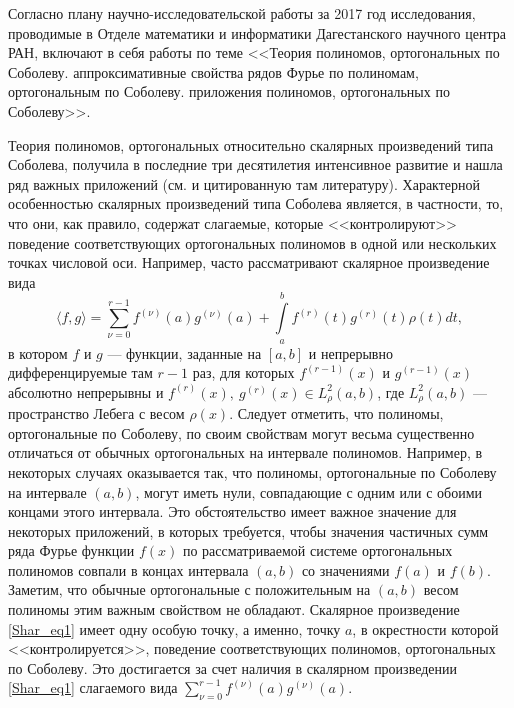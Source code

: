 \Introduction

Согласно плану научно-исследовательской работы за 2017 год исследования, проводимые в Отделе математики и информатики Дагестанского научного центра РАН, включают в себя работы по теме
<<Теория полиномов, ортогональных по Соболеву. аппроксимативные свойства рядов Фурье по полиномам, ортогональным по Соболеву. приложения полиномов, ортогональных по Соболеву>>.


Теория полиномов, ортогональных относительно скалярных произведений типа Соболева, получила в последние три десятилетия интенсивное развитие и нашла ряд важных приложений (см. \cite{sobleg-IserKoch, sobleg-MarcelAlfaroRezola, charlier-Shar3, sobleg-KwonLittl1, sobleg-KwonLittl2, sobleg-MarcelXu} и цитированную там литературу). Характерной особенностью скалярных произведений типа Соболева является, в частности, то, что они, как правило, содержат слагаемые, которые <<контролируют>> поведение соответствующих ортогональных полиномов в одной или нескольких точках числовой оси. Например, часто рассматривают скалярное произведение вида
\begin{equation}\label{Shar_eq1}
\langle f,g \rangle = \sum_{\nu=0}^{r-1} f^{(\nu)}(a)g^{(\nu)}(a) + \int\limits_{a}^{b} f^{(r)}(t)g^{(r)}(t)\rho(t)dt,
\end{equation}
в котором $f$ и $g$ --- функции, заданные на $[a,b]$ и непрерывно дифференцируемые там $r-1$ раз, для которых $f^{(r-1)}(x)$ и $g^{(r-1)}(x)$ абсолютно непрерывны и $f^{(r)}(x),\ g^{(r)}(x)\in L^2_\rho(a,b)$, где $L^2_\rho(a,b)$ --- пространство Лебега с весом $\rho(x)$.
Следует отметить, что полиномы, ортогональные по Соболеву, по своим свойствам могут весьма существенно отличаться от обычных ортогональных на интервале полиномов. Например, в некоторых случаях оказывается так, что полиномы, ортогональные по Соболеву на интервале $(a,b)$, могут иметь нули, совпадающие с одним или с обоими концами этого интервала. Это обстоятельство имеет важное значение для некоторых приложений, в которых требуется, чтобы значения частичных сумм ряда Фурье функции $f(x)$ по рассматриваемой системе ортогональных полиномов совпали в концах интервала $(a,b)$ со значениями $f(a)$ и $f(b)$. Заметим, что обычные ортогональные с положительным на $(a,b)$ весом полиномы этим важным свойством не обладают. Скалярное произведение \eqref{Shar_eq1} имеет одну особую точку, а именно, точку $a$, в окрестности которой <<контролируется>>, поведение соответствующих полиномов, ортогональных по Соболеву. Это достигается за счет наличия в скалярном произведении \eqref{Shar_eq1} слагаемого вида $\sum\limits_{\nu=0}^{r-1}f^{(\nu)}(a)g^{(\nu)}(a)$.

